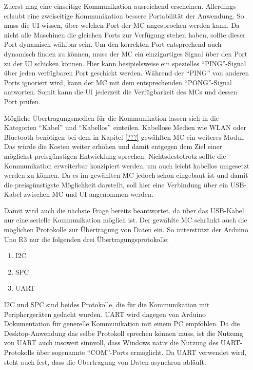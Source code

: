 Zuerst mag eine einseitige Kommunikation ausreichend erscheinen.
Allerdings erlaubt eine zweiseitige Kommunikation bessere Portabilität der Anwendung.
So muss die \ac{UI} wissen, über welchen Port der \ac{MC} angesprochen werden kann.
Da nicht alle Maschinen die gleichen Ports zur Verfügung stehen haben, sollte dieser Port dynamisch wählbar sein.
Um den korrekten Port entsprechend auch dynamisch finden zu können, muss der \ac{MC} ein einzigartiges Signal über den Port zu der \ac{UI} schicken können.
Hier kann besipielsweise ein spezielles \enquote{PING}-Signal über jeden verfügbaren Port geschickt werden.
Während der \enquote{PING} von anderen Ports ignoriert wird, kann der \ac{MC} mit dem entsprechenden \enquote{PONG}-Signal antworten.
Somit kann die \ac{UI} jederzeit die Verfügbarkeit des \ac{MC}s und dessen Port prüfen.

Mögliche Übertragungsmedien für die Kommunikation lassen sich in die Kategorien \enquote{Kabel} und \enquote{Kabellos} einteilen.
Kabellose Medien wie WLAN oder Bluetooth benötigen bei dem in Kapitel \ref{???} gewählten \ac{MC} ein weiteres Modul.
Das würde die Kosten weiter erhöhen und damit entgegen dem Ziel einer möglichst preisgünstigen Entwicklung sprechen.
Nichtsdestotrotz sollte die Kommunikation erweiterbar konzipiert werden, um auch leicht kabellos umgesetzt werden zu können.
Da es im gewählten \ac{MC} jedoch schon eingebaut ist und damit die preisgünstigste Möglichkeit darstellt, soll hier eine Verbindung über ein USB-Kabel zwischen \ac{MC} und \ac{UI} angenommen werden.

Damit wird auch die nächste Frage bereits beantwortet, da über das USB-Kabel nur eine serielle Kommunikation möglich ist.
Der gewählte \ac{MC} schränkt auch die möglichen Protokolle zur Übertragung von Daten ein.
So unterstützt der Arduino Uno R3 nur die folgenden drei Übertragungsprotokolle:
\begin{enumerate}
    \item \ac{I2C}
    \item \ac{SPC}
    \item \ac{UART}
\end{enumerate}
\ac{I2C} und \ac{SPC} sind beides Protokolle, die für die Kommunikation mit Periphergeräten gedacht wurden.
\ac{UART} wird dagegen von Arduino Dokumentation für generelle Kommunikation mit einem PC empfohlen. %
Da die Desktop-Anwendung das selbe Protokoll sprechen können muss, ist die Nutzung von \ac{UART} auch insoweit sinnvoll, dass Windows nativ die Nutzung des \ac{UART}-Protokolls über sogenannte \enquote{COM}-Ports ermöglicht.
Da \ac{UART} verwendet wird, steht auch fest, dass die Übertragung von Daten asynchron abläuft.

